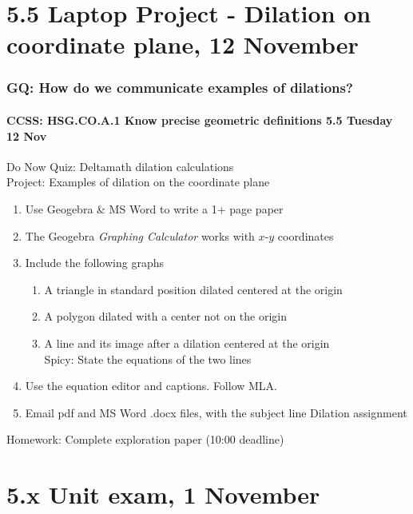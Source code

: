 \documentclass{beamer}
\begin{document}
\section{5.5 Laptop Project - Dilation on coordinate plane, 12 November}
\frame
{
\frametitle{GQ: How do we communicate examples of dilations?}
\framesubtitle{CCSS: HSG.CO.A.1 Know precise geometric definitions \hfill \alert{5.5 Tuesday 12 Nov}}

\begin{block}{Do Now Quiz: Deltamath dilation calculations \\[0.5cm]
  Project: Examples of dilation on the coordinate plane}
\begin{enumerate}
  \item Use Geogebra \& MS Word to write a 1+ page paper
  \item The Geogebra \emph{Graphing Calculator} works with $x$-$y$ coordinates
  \item Include the following graphs
  \begin{enumerate}
    \item A triangle in standard position dilated centered at the origin
    \item A polygon dilated with a center not on the origin
    \item A line and its image after a dilation centered at the origin\\
    Spicy: State the equations of the two lines
  \end{enumerate}
  \item Use the equation editor and captions. Follow MLA.
  \item Email pdf and MS Word .docx files, with the subject line Dilation assignment
\end{enumerate}
\end{block}
Homework: Complete exploration paper (10:00 deadline)
}

\section{5.x Unit exam, 1 November}
\end{document}
